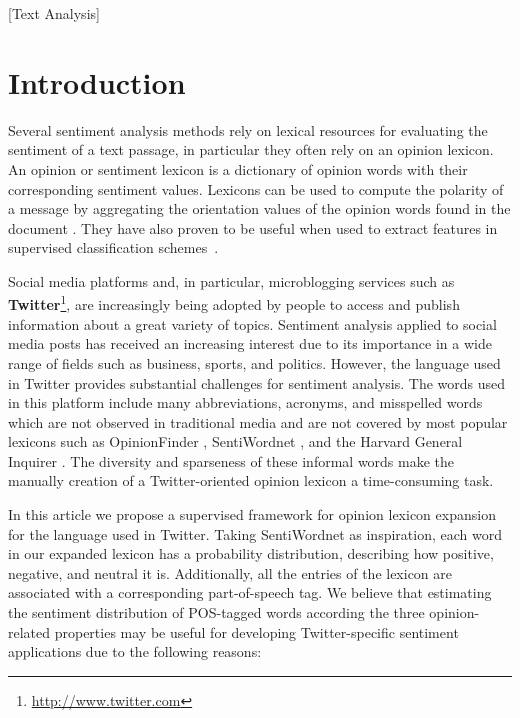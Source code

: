 \documentclass{sig-alternate}
\begin{document}
[Text Analysis]




\section{Introduction}\label{sec:intro}

Several sentiment analysis methods rely on lexical resources for evaluating the sentiment of a text passage, in particular they often rely on an opinion lexicon. An opinion or sentiment lexicon is a dictionary of opinion words with their corresponding sentiment values. Lexicons can be used to compute the polarity of a message by aggregating the orientation values of the opinion words found in the document \cite{Wiebe2000}. They have also proven to be useful when used to extract features in supervised classification schemes~\cite{jiang2011target, kouloumpis2011twitter,Zirn20011}. 

Social media platforms and, in particular, microblogging services such as \textbf{Twitter}\footnote{\url{http://www.twitter.com}}, are increasingly being adopted by people to access and publish information about a great variety of topics. Sentiment analysis applied to social media posts has received an increasing interest due to its importance in a wide range of fields such as business, sports, and politics. However, the language used in Twitter provides substantial challenges for sentiment analysis. The words used in this platform include many abbreviations, acronyms, and misspelled words which are not observed in traditional media and are not covered by most popular lexicons such as OpinionFinder \cite{Wilson2005}, SentiWordnet \cite{esuli2006}, and the Harvard General Inquirer \cite{stone66}. The diversity and sparseness of these informal words make the manually creation of a Twitter-oriented opinion lexicon a time-consuming task.


In this article we propose a supervised framework for opinion lexicon expansion for the language used in Twitter.  Taking SentiWordnet as inspiration, each word in our expanded lexicon has a probability distribution, describing how positive, negative, and neutral it is.  Additionally, all the entries of the lexicon are associated with a corresponding part-of-speech tag. We believe that estimating the sentiment distribution of POS-tagged words according the three opinion-related properties may be useful for developing Twitter-specific sentiment applications due to the following reasons:
\end{document}
